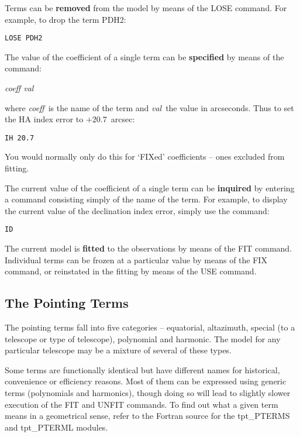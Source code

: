 Terms can be {\bf removed} from the model by means of the LOSE
command.
For example, to drop the term PDH2:
\begin{cmnds}
\> \> {\tt LOSE PDH2}
\end{cmnds}

The value of the coefficient of a single term can be {\bf specified} by
means of the command:
\begin{cmnds}
\> \> {\it coeff val}
\end{cmnds}
where {\it coeff}\, is the name of the term and {\it val}\, the value in
arcseconds.  Thus to set the HA index error to $+20.7$~arcsec:
\begin{cmnds}
\> \> {\tt IH 20.7}
\end{cmnds}
You would normally only do this for `FIXed' coefficients -- ones
excluded from fitting.

The current value of the coefficient of a single term can
be {\bf inquired} by entering a command consisting simply of the
name of the term.
For example, to display the current value of the declination
index error, simply use the command:
\begin{cmnds}
\> \> {\tt ID}
\end{cmnds}

The current model is {\bf fitted} to the observations by means of
the FIT command.  Individual terms can be frozen at a
particular value by means of the FIX command, or reinstated
in the fitting by means of the USE command.

\subsection{The Pointing Terms}
The pointing terms fall into five categories -- equatorial,
altazimuth, special (to a telescope or type of telescope), polynomial
and harmonic.  The model for any particular telescope may be a
mixture of several of these types.

Some terms are functionally identical but have different names
for historical, convenience or efficiency reasons.  Most of them can
be expressed using generic terms (polynomials and harmonics), though
doing so will lead to slightly slower execution of the FIT and UNFIT
commands.
To find out what a given
term means in a geometrical sense, refer to the Fortran source for
the tpt\_PTERMS and tpt\_PTERML modules.

